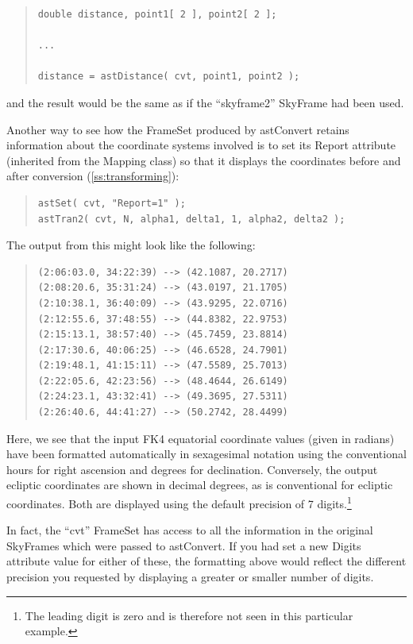 \documentclass[twoside,11pt]{article}
\newcommand{\htmlref}[2]{#1}
\newcommand{\secref}[1]{\S\ref{#1}}
\renewcommand{\secref}[1]{\ref{#1}}
\begin{document}
\begin{quote}
\small
\begin{verbatim}
double distance, point1[ 2 ], point2[ 2 ];

...

distance = astDistance( cvt, point1, point2 );
\end{verbatim}
\normalsize
\end{quote}

and the result would be the same as if the ``skyframe2'' SkyFrame had
been used.

Another way to see how the FrameSet produced by astConvert retains
information about the coordinate systems involved is to set its \htmlref{Report}{Report}
attribute (inherited from the Mapping class) so that it displays the
coordinates before and after conversion (\secref{ss:transforming}):

\begin{quote}
\small
\begin{verbatim}
astSet( cvt, "Report=1" );
astTran2( cvt, N, alpha1, delta1, 1, alpha2, delta2 );
\end{verbatim}
\normalsize
\end{quote}

The output from this might look like the following:

\begin{quote}
\begin{verbatim}
(2:06:03.0, 34:22:39) --> (42.1087, 20.2717)
(2:08:20.6, 35:31:24) --> (43.0197, 21.1705)
(2:10:38.1, 36:40:09) --> (43.9295, 22.0716)
(2:12:55.6, 37:48:55) --> (44.8382, 22.9753)
(2:15:13.1, 38:57:40) --> (45.7459, 23.8814)
(2:17:30.6, 40:06:25) --> (46.6528, 24.7901)
(2:19:48.1, 41:15:11) --> (47.5589, 25.7013)
(2:22:05.6, 42:23:56) --> (48.4644, 26.6149)
(2:24:23.1, 43:32:41) --> (49.3695, 27.5311)
(2:26:40.6, 44:41:27) --> (50.2742, 28.4499)
\end{verbatim}
\end{quote}

Here, we see that the input FK4 equatorial coordinate values (given in
radians) have been formatted automatically in sexagesimal notation
using the conventional hours for right ascension and degrees for
declination. Conversely, the output ecliptic coordinates are shown in
decimal degrees, as is conventional for ecliptic coordinates. Both are
displayed using the default precision of 7 digits.\footnote{The
leading digit is zero and is therefore not seen in this particular
example.}

In fact, the ``cvt'' FrameSet has access to all the information in the
original SkyFrames which were passed to astConvert. If you had set a
new Digits attribute value for either of these, the formatting above
would reflect the different precision you requested by displaying a
greater or smaller number of digits.
\end{document}
